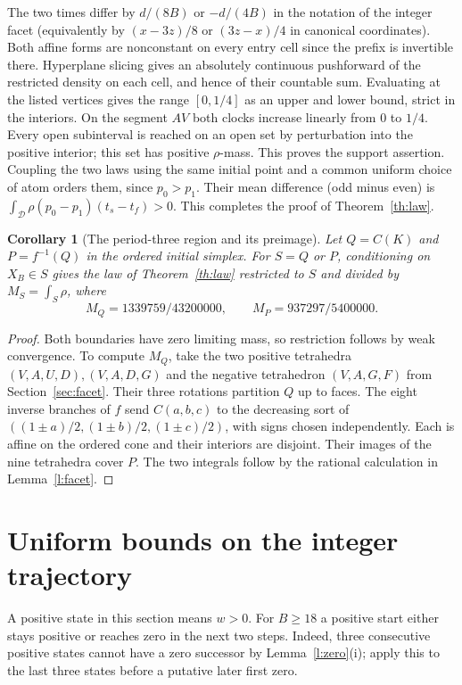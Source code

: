 \documentclass[11pt,reqno]{amsart}
\newtheorem{corollary}[theorem]{Corollary}
\newcommand{\D}{\mathcal D}
\begin{document}
The two times differ by $d/(8B)$ or $-d/(4B)$ in the notation of the
integer facet (equivalently by $(x-3z)/8$ or $(3z-x)/4$ in canonical
coordinates). Both affine forms are nonconstant on every entry cell
since the prefix is invertible there. Hyperplane slicing gives an absolutely
continuous pushforward of the restricted density on each cell, and hence
of their countable sum. Evaluating at the listed vertices gives the
range $[0,1/4]$ as an upper and lower bound, strict in the interiors.
On the segment $AV$ both clocks increase linearly from $0$ to $1/4$.
Every open subinterval is reached on an open set by perturbation into
the positive interior; this set has positive $\rho$-mass. This proves
the support assertion. Coupling the two laws using the same initial
point and a common uniform choice of atom orders them, since $p_0>p_1$.
Their mean difference (odd minus even) is
$\int_{\D}\rho(p_0-p_1)(t_s-t_f)>0$.
This completes the proof of Theorem~\ref{th:law}.
\begin{corollary}[The period-three region and its preimage]\label{cor:regional}
Let $Q=C(K)$ and $P=f^{-1}(Q)$ in the ordered initial simplex. For
$S=Q$ or $P$, conditioning on $X_B\in S$ gives the law of
Theorem~\ref{th:law} restricted to $S$ and divided by $M_S=\int_S\rho$,
where
\[
 M_Q=1339759/43200000,\qquad M_P=937297/5400000 .
\]
\end{corollary}
\begin{proof}
Both boundaries have zero limiting mass, so restriction follows by weak
convergence. To compute $M_Q$, take the two positive tetrahedra
$(V,A,U,D),(V,A,D,G)$ and the negative tetrahedron $(V,A,G,F)$
from Section~\ref{sec:facet}. Their three rotations partition $Q$ up to faces.
The eight inverse branches of $f$ send $C(a,b,c)$ to the decreasing sort
of $( (1\pm a)/2,(1\pm b)/2,(1\pm c)/2 )$, with signs chosen
independently. Each is affine on the ordered cone and their interiors are
disjoint. Their images of the nine tetrahedra cover $P$. The two
integrals follow by the rational calculation in Lemma~\ref{l:facet}.
\end{proof}

\section{Uniform bounds on the integer trajectory}\label{sec:uniform}
A positive state in this section means $w>0$. For $B\ge18$ a positive
start either stays positive or reaches zero in the next two steps. Indeed,
three consecutive positive states cannot have a zero successor by
Lemma~\ref{l:zero}(i); apply this to the last three states before a
putative later first zero.
\end{document}
